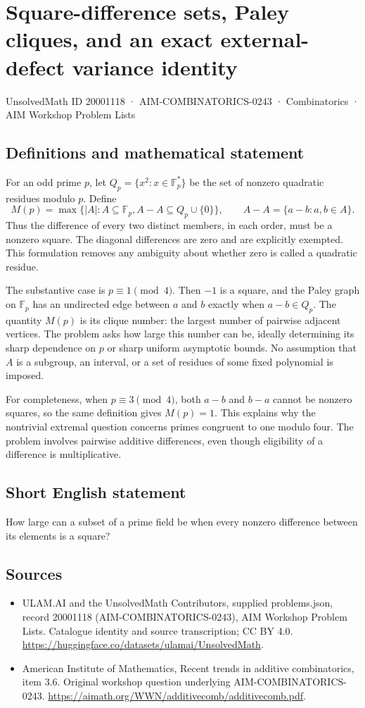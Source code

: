 \documentclass[11pt,a4paper]{article}
\begin{document}
\section*{Square-difference sets, Paley cliques, and an exact external-defect variance identity}\label{20001118}
{\small UnsolvedMath ID 20001118 · AIM-COMBINATORICS-0243 · Combinatorics · AIM Workshop Problem Lists}
\subsection{Definitions and mathematical statement}
For an odd prime $p$, let
$Q_p=\{x^2:x\in\mathbb F_p^*\}$ be the set of nonzero quadratic
residues modulo $p$. Define
\[
 M(p)=\max\{|A|:A\subseteq\mathbb F_p,
                              A-A\subseteq Q_p\cup\{0\}\},
 \qquad A-A=\{a-b:a,b\in A\}.
\]
Thus the difference of every two distinct members, in each order,
must be a nonzero square. The diagonal differences are zero and
are explicitly exempted. This formulation removes any ambiguity
about whether zero is called a quadratic residue.

The substantive case is $p\equiv1\pmod4$. Then $-1$ is a square,
and the Paley graph on $\mathbb F_p$ has an undirected edge between
$a$ and $b$ exactly when $a-b\in Q_p$. The quantity $M(p)$ is
its clique number: the largest number of pairwise adjacent vertices.
The problem asks how large this number can be, ideally determining
its sharp dependence on $p$ or sharp uniform asymptotic bounds.
No assumption that $A$ is a subgroup, an interval, or a set of
residues of some fixed polynomial is imposed.

For completeness, when $p\equiv3\pmod4$, both $a-b$ and $b-a$
cannot be nonzero squares, so the same definition gives $M(p)=1$.
This explains why the nontrivial extremal question concerns primes
congruent to one modulo four. The problem involves pairwise additive
differences, even though eligibility of a difference is multiplicative.
\subsection{Short English statement}
How large can a subset of a prime field be when every nonzero difference between its elements is a square?
\subsection{Sources}
\begin{itemize}
\item[S1] ULAM.AI and the UnsolvedMath Contributors, supplied problems.json, record 20001118 (AIM-COMBINATORICS-0243), AIM Workshop Problem Lists. Catalogue identity and source transcription; CC BY 4.0.
\url{https://huggingface.co/datasets/ulamai/UnsolvedMath}.
\item[S2] American Institute of Mathematics, Recent trends in additive combinatorics, item 3.6. Original workshop question underlying AIM-COMBINATORICS-0243.
\url{https://aimath.org/WWN/additivecomb/additivecomb.pdf}.
\end{itemize}
\end{document}
